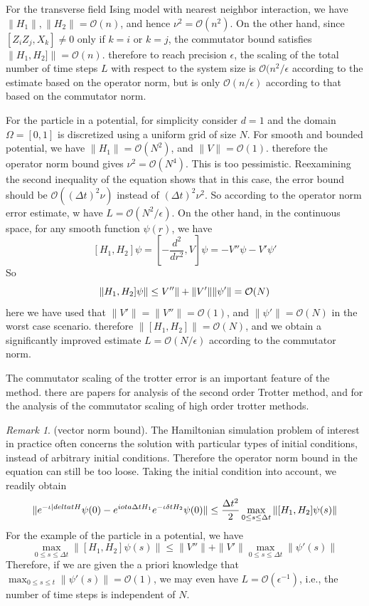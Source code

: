 \documentclass[12pt, oneside]{book}
\theoremstyle{definition}
\theoremstyle{definition}
\theoremstyle{remark}
\newtheorem*{remark}{Remark}
\begin{document}
For the transverse field Ising model with nearest neighbor interaction, we have $\|H_1\|,\|H_2\|=\mathcal{O}(n)$, and hence $\nu^2=\mathcal{O}(n^2)$. On the other hand, since $[Z_iZ_j,X_k]\neq 0$ only if $k=i$ or $k=j$, the commutator bound satisfies $\|H_1,H_2]\|=\mathcal{O}(n)$. therefore to reach precision $\epsilon$, the scaling of the total number of time steps $L$ with respect to the system size is $\mathcal{O}(n^2/\epsilon$ according to the estimate based on the operator norm, but is only $\mathcal{O}(n/\epsilon)$ according to that based on the commutator norm.

For the particle in a potential, for simplicity consider $d=1$ and the domain $\Omega=[0,1]$ is discretized using a uniform grid of size $N$. For smooth and bounded potential, we have $\|H_1\|=\mathcal{O}(N^2)$, and $\|V\|=\mathcal{O}(1)$. therefore the operator norm bound gives $\nu^2=\mathcal{O}(N^4)$. This is too pessimistic. Reexamining the second inequality of the equation shows that in this case, the error bound should be $\mathcal{O}((\Delta t)^2\nu)$ instead of $(\Delta t)^2 \nu^2$. So according to the operator norm error estimate, w have $L=\mathcal{O}(N^2/\epsilon)$. On the other hand, in the continuous space, for any smooth function $\psi(r)$, we have
\[
[H_1,H_2]\psi=\left[-\frac{d^2}{dr^2},V\right]\psi=-V''\psi-V'\psi'
\]
So
\[
\|H_1,H_2]\psi\|\leq \\V''\|+\|V'\|\|\psi'\|=\mathcal{O}(N)
\]
here we have used that $\|V'\|=\|V''\|=\mathcal{O}(1)$, and $\|\psi'\|=\mathcal{O}(N)$ in the worst case scenario. therefore $\|[H_1,H_2]\|=\mathcal{O}(N)$, and we obtain a significantly improved estimate $L=\mathcal{O}(N/\epsilon)$ according to the commutator norm.

The commutator scaling of the trotter error is an important feature of the method. there are papers for analysis of the second order Trotter method, and for the analysis of the commutator scaling of high order trotter methods.

\begin{remark}
    (vector norm bound). The Hamiltonian simulation problem of interest in practice often concerns the solution with particular types of initial conditions, instead of arbitrary initial conditions. Therefore the operator norm bound in the equation can still be too loose. Taking the initial condition into account, we readily obtain
    \[
    \|e^{-\iota |delta tH}\psi(0)-e^{\-iota \Delta tH_1}e^{-\iota \delta tH_2}\psi(0)\|\leq \frac{\Delta t^2}{2}\max_{0\leq s \leq \Delta t} \|[H_1,H_2]\psi(s)\|
    \]
    For the example of the particle in a potential, we have
    \[
    \max_{0\leq s\leq \Delta t} \|[H_1,H_2]\psi(s)\|\leq \|V''\|+\|V'\| \max_{0\leq s \leq \Delta t} \|\psi'(s)\|
    \]
    Therefore, if we are given the a priori knowledge that $\max_{0\leq s \leq t} \|\psi'(s)\|=\mathcal{O}(1)$, we may even have $L=\mathcal{O}(\epsilon^{-1})$, i.e., the number of time steps is independent of $N$.
\end{remark}
\end{document}

